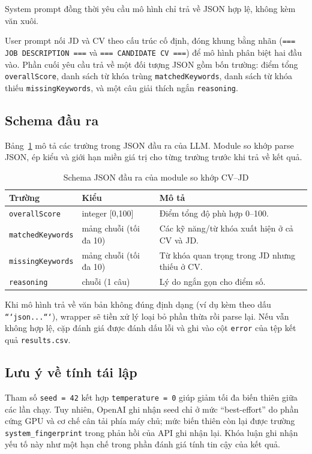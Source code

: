\documentclass[../DoAn.tex]{subfiles}
\begin{document}
System prompt đồng thời yêu cầu mô hình chỉ trả về JSON hợp lệ, không kèm văn xuôi.

User prompt nối JD và CV theo cấu trúc cố định, đóng khung bằng nhãn (\texttt{=== JOB DESCRIPTION ===} và \texttt{=== CANDIDATE CV ===}) để mô hình phân biệt hai đầu vào. Phần cuối yêu cầu trả về một đối tượng JSON gồm bốn trường: điểm tổng \texttt{overallScore}, danh sách từ khóa trùng \texttt{matchedKeywords}, danh sách từ khóa thiếu \texttt{missingKeywords}, và một câu giải thích ngắn \texttt{reasoning}.

\subsection{Schema đầu ra}

Bảng~\ref{tab:llm-schema} mô tả các trường trong JSON đầu ra của LLM. Module so khớp parse JSON, ép kiểu và giới hạn miền giá trị cho từng trường trước khi trả về kết quả.

\begin{table}[H]
\centering
\caption{Schema JSON đầu ra của module so khớp CV--JD}
\label{tab:llm-schema}
\begin{tabular}{|l|l|p{7cm}|}
\hline
\textbf{Trường} & \textbf{Kiểu} & \textbf{Mô tả} \\
\hline
\texttt{overallScore} & integer [0,100] & Điểm tổng độ phù hợp 0--100. \\
\hline
\texttt{matchedKeywords} & mảng chuỗi (tối đa 10) & Các kỹ năng/từ khóa xuất hiện ở cả CV và JD. \\
\hline
\texttt{missingKeywords} & mảng chuỗi (tối đa 10) & Từ khóa quan trọng trong JD nhưng thiếu ở CV. \\
\hline
\texttt{reasoning} & chuỗi (1 câu) & Lý do ngắn gọn cho điểm số. \\
\hline
\end{tabular}
\end{table}

Khi mô hình trả về văn bản không đúng định dạng (ví dụ kèm theo dấu \texttt{```json...```}), wrapper sẽ tiền xử lý loại bỏ phần thừa rồi parse lại. Nếu vẫn không hợp lệ, cặp đánh giá được đánh dấu lỗi và ghi vào cột \texttt{error} của tệp kết quả \texttt{results.csv}.

\subsection{Lưu ý về tính tái lập}

Tham số \texttt{seed = 42} kết hợp \texttt{temperature = 0} giúp giảm tối đa biến thiên giữa các lần chạy. Tuy nhiên, OpenAI ghi nhận seed chỉ ở mức ``best-effort'' do phần cứng GPU và cơ chế cân tải phía máy chủ; mức biến thiên còn lại được trường \texttt{system\_fingerprint} trong phản hồi của API ghi nhận lại. Khóa luận ghi nhận yếu tố này như một hạn chế trong phần đánh giá tính tin cậy của kết quả.
\end{document}
